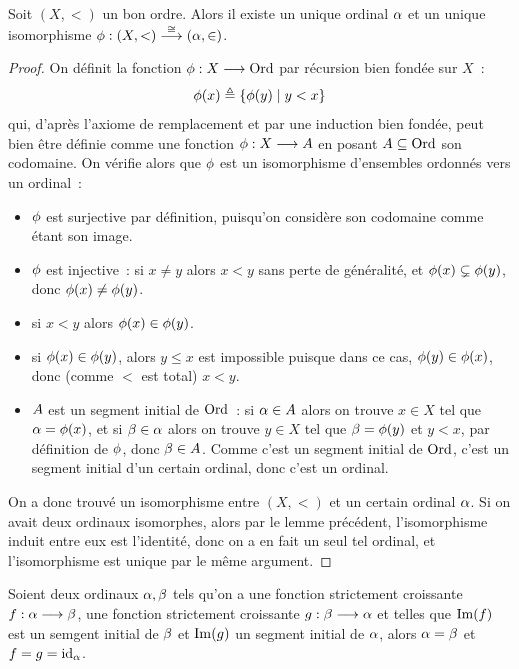\begin{proposition}
  Soit $(X,<)$ un bon ordre. Alors il existe un unique ordinal $\alpha$ et un
  unique isomorphisme $\phi : \displaystyle (X,<) \overset{\cong}{\longrightarrow} (\alpha,\in)$.
\end{proposition}

\begin{proof}
  On définit la fonction $\phi : \displaystyle X \longrightarrow \operatorname{Ord}$ par récursion bien
  fondée sur $X$~:
  \[\phi(x)\triangleq \left\{ \phi(y) \;\middle\vert\; y < x \right\}\]
  qui, d'après l'axiome de remplacement et par une induction bien fondée,
  peut bien être définie comme une fonction $\phi : \displaystyle X \longrightarrow A$
  en posant $A\subseteq \operatorname{Ord}$ son codomaine. On vérifie alors que $\phi$
  est un isomorphisme d'ensembles ordonnés vers un ordinal~:
  \begin{itemize}
  \item $\phi$ est surjective par définition, puisqu'on considère son
    codomaine comme étant son image.
  \item $\phi$ est injective~: si $x\neq y$ alors $x < y$ sans perte de
    généralité, et $\phi(x) \subsetneq \phi(y)$, donc
    $\phi(x)\neq\phi(y)$.
  \item si $x < y$ alors $\phi(x) \in \phi(y)$.
  \item si $\phi(x) \in \phi(y)$, alors $y \leq x$ est impossible puisque
    dans ce cas, $\phi(y) \in \phi(x)$, donc (comme $<$ est total)
    $x < y$.
  \item $A$ est un segment initial de $\operatorname{Ord}$~: si $\alpha \in A$ alors
    on trouve $x \in X$ tel que $\alpha = \phi(x)$, et si $\beta \in \alpha$
    alors on trouve $y\in X$ tel que $\beta = \phi(y)$ et $y < x$, par
    définition de $\phi$, donc $\beta \in A$. Comme c'est un segment
    initial de $\operatorname{Ord}$, c'est un segment initial d'un certain ordinal, donc c'est
    un ordinal.
  \end{itemize}
  On a donc trouvé un isomorphisme entre $(X,<)$ et un certain ordinal $\alpha$.
  Si on avait deux ordinaux isomorphes, alors par le lemme précédent,
  l'isomorphisme induit entre eux est l'identité, donc on a en fait un seul
  tel ordinal, et l'isomorphisme est unique par le même argument.
\end{proof}

\begin{corollary}
  Soient deux ordinaux $\alpha,\beta$ tels qu'on a une fonction strictement
  croissante $f : \displaystyle \alpha \longrightarrow \beta$, une fonction strictement
  croissante $g : \displaystyle \beta \longrightarrow \alpha$ et telles que $\operatorname{Im}(f)$ est un
  semgent initial de $\beta$ et $\operatorname{Im}(g)$ un segment initial de $\alpha$, alors
  $\alpha = \beta$ et $f = g = \operatorname{id}_{\alpha}$.
\end{corollary}

